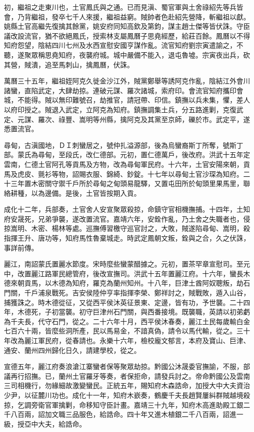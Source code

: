 \begin{pinyinscope}
初，繼祖之走東川也，土官鳳氏與之通。已而見滇、蜀官軍與土舍祿紹先等兵皆會，乃背繼祖，發卒七千人來援，繼祖益窮。賊帥者色赴紹先營降，斬繼祖以獻。姚縣土官高繼先復擒其餘黨，姚安府同知高欽及第鈞，謀主趙士傑等皆伏誅。守臣議改設流官，猶不欲絕鳳氏，授索林支屬鳳曆子思堯經歷，給莊百餘。鳳曆以不得知府怨望，陰結四川七州及水西宣慰安國亨謀作亂。流官知府劉宗寅遣諭之，不聽，遂聚眾稱思堯知府，夜襲府城。城中嚴備不能入，退屯魯墟。宗寅夜出兵，砍其營，賊潰，追至馬刺山，擒鳳曆，伏誅。

萬曆三十五年，繼祖姪阿克久徙金沙江外，賊黨鄭舉等誘阿克作亂，陰結江外會川諸蠻，直陷武定，大肆劫掠。連破元謀、羅次諸城，索府印。會流官知府攜印會城，不能得。賊以無印難號召，劫推官，請冠帶、印信。鎮撫以兵未集，懼，差人以府印授之。賊退入武定，立阿克為知府。鎮撫調集土兵，分五路進剿，克復武定、元謀、羅次、祿豐、嵩明等州縣，擒阿克及其黨至京師，礫於市。武定平，遂悉置流官。

尋甸，古滇國地，ＤＩ刺蠻居之，號仲扎溢源部，後為烏蠻裔斯丁所奪，號斯丁部。蒙氏為尋甸，至段氏，改仁德部。元初，置仁德萬戶，後改府。洪武十五年定雲南，仁德土官阿孔等貢馬及方物，改為尋甸軍民府。十六年，土官安陽來朝，貢馬及虎皮、氈衫等物，詔賜衣服、錦綺、鈔錠。十七年以尋甸土官沙琛為知府。二十三年置木密關守禦千戶所於尋甸之甸頭易龍驛，又置屯田所於甸頭里果馬里，聯絡耕種，以為邊備。是後，土官皆按期入貢。

成化十二年，兵部奏，土官舍人安宣聚眾殺掠，命鎮守官相機撫捕。十四年，土知府安晟死，兄弟爭襲，遂改置流官。嘉靖六年，安銓作亂，乃土舍之失職者也，侵掠嵩明、木密、楊林等處。巡撫傅習檄守巡官討之，大敗，賊遂陷尋甸、嵩明，殺指揮王升、唐功等，知府馬性魯棄城走。時武定鳳朝文叛，銓與之合，久之伏誅，事詳前傳。

麗江，南詔蒙氏置麗水節度。宋時麼些蠻蒙醋據之。元初，置茶罕章宣慰司。至元中，改置麗江路軍民總管府，後改宣撫司。洪武十五年置麗江府。十六年，蠻長木德來朝貢馬，以木德為知府，羅克為蘭州知州。十八年，巨津土酋阿奴聰叛，劫石門關，千戶浦泉戰死。吉安侯陸仲亨率指揮李榮、鄭祥討之，賊戰敗，遁入山谷，捕獲誅之。時木德從征，又從西平侯沐英征景東、定邊，皆有功，予世襲。二十四年，木德死，子初當襲。初守巨津州石門關，與西番接境。既襲職，英請以初弟虧為千夫長，代守石門，從之。二十六年十月，西平侯沐春奏，麗江土民每歲輸白金七百六十兩，皆麼些洞所產，民以馬易金，不諳真偽，請令以馬代輸，從之。三十年改為麗江軍民府，從春請也。永樂十六年，檢校龐文郁言，本府及寶山、巨津、通安、蘭州四州歸化日久，請建學校，從之。

宣德五年，麗江府奏浪滄江寨蠻者保等聚眾劫掠。黔國公沐晟委官撫諭，不服，部議再行招撫。已，蘭州土官羅牙等奏，者保拒命，請發兵討之。帝命黔國公及雲南三司相機行，勿緣細故激變蠻民。正統五年，賜知府木森誥命，加授大中大夫資治少尹，以征麓川功也。成化十一年，知府木嶔奏，鶴慶千夫長趙賢屢糾群賊越境殺掠，乞調旁衛官軍擒剿，命移知守臣計畫。嘉靖三十九年，知府木高進助殿工銀二千八百兩，詔加文職三品服色，給誥命。四十年又進木植銀二千八百兩，詔進一級，授亞中大夫，給誥命。


\end{pinyinscope}
